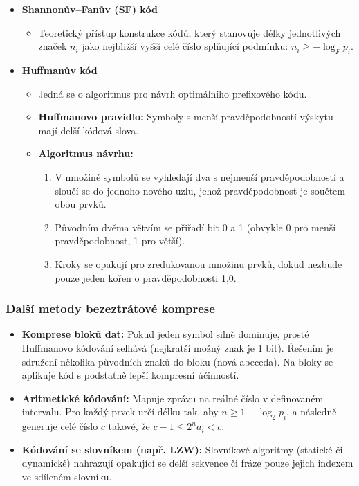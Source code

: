         \begin{itemize}
            \item\textbf{Shannonův--Fanův (SF) kód}
                \begin{itemize}
                    \item Teoretický přístup konstrukce kódů, který stanovuje délky jednotlivých značek $n_i$ jako nejbližší vyšší celé číslo splňující podmínku: $n_i \ge -\log_F p_i$.
                \end{itemize}
            \item\textbf{Huffmanův kód}
                \begin{itemize}
                    \item Jedná se o algoritmus pro návrh optimálního prefixového kódu.
                    \item \textbf{Huffmanovo pravidlo:} Symboly s menší pravděpodobností výskytu mají delší kódová slova. 
                    \item \textbf{Algoritmus návrhu:}
                    \begin{enumerate}
                        \item V množině symbolů se vyhledají dva s nejmenší pravděpodobností a sloučí se do jednoho nového uzlu, jehož pravděpodobnost je součtem obou prvků.
                        \item Původním dvěma větvím se přiřadí bit 0 a 1 (obvykle 0 pro menší pravděpodobnost, 1 pro větší).
                        \item Kroky se opakují pro zredukovanou množinu prvků, dokud nezbude pouze jeden kořen o pravděpodobnosti 1,0.
                    \end{enumerate}
                \end{itemize}
        \end{itemize}
    \subsubsection{Další metody bezeztrátové komprese}
        \begin{itemize}
            \item \textbf{Komprese bloků dat:} Pokud jeden symbol silně dominuje, prosté Huffmanovo kódování selhává (nejkratší možný znak je 1 bit). Řešením je sdružení několika původních znaků do bloku (nová abeceda). Na bloky se aplikuje kód s podstatně lepší kompresní účinností.
            \item \textbf{Aritmetické kódování:} Mapuje zprávu na reálné číslo v definovaném intervalu. Pro každý prvek určí délku tak, aby $n \ge 1 - \log_2 p_i$, a následně generuje celé číslo $c$ takové, že $c - 1 \le 2^n a_i < c$.
            \item \textbf{Kódování se slovníkem (např. LZW):} Slovníkové algoritmy (statické či dynamické) nahrazují opakující se delší sekvence či fráze pouze jejich indexem ve sdíleném slovníku.
        \end{itemize}
